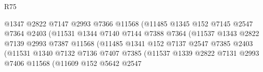 \begin{lexlean}{R75}
\begin{coremodule}
                                        @1347
                                        @2822
                                        @7147
                                        @2993
                                        @7366
                                        @11568
                                        (@11485
                                          @1345
                                          @152
                                          @7145
                                          @2547
                                          @7364
                                          @2403
                                          (@11531
                                            @1344
                                            @7140
                                            @7144
                                            @7388
                                            @7364
                                            (@11537
                                              @1343
                                              @2822
                                              @7139
                                              @2993
                                              @7387
                                              @11568
                                              (@11485
                                                @1341
                                                @152
                                                @7137
                                                @2547
                                                @7385
                                                @2403
                                                (@11531
                                                  @1340
                                                  @7132
                                                  @7136
                                                  @7407
                                                  @7385
                                                  (@11537
                                                    @1339
                                                    @2822
                                                    @7131
                                                    @2993
                                                    @7406
                                                    @11568
                                                    (@11609
                                                      @152
                                                      @5642
                                                      @2547

\end{coremodule}
\end{lexlean}
